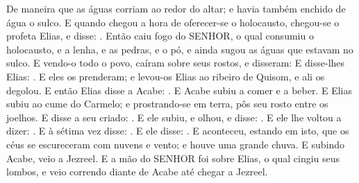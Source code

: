 {  De maneira que as águas corriam ao redor do altar; e havia também enchido de água o sulco.
  E quando chegou a hora de oferecer-se o holocausto, chegou-se o profeta Elias, e disse: .
  Então caiu fogo do SENHOR, o qual consumiu o holocausto, e a lenha, e as pedras, e o pó, e ainda sugou as águas que estavam no sulco.
  E vendo-o todo o povo, caíram sobre seus rostos, e disseram: 
  E disse-lhes Elias: . E eles os prenderam; e levou-os Elias ao ribeiro de Quisom, e ali os degolou.
  E então Elias disse a Acabe: .
  E Acabe subiu a comer e a beber. E Elias subiu ao cume do Carmelo; e prostrando-se em terra, pôs seu rosto entre os joelhos.
  E disse a seu criado: . E ele subiu, e olhou, e disse: . E ele lhe voltou a dizer: .
  E à sétima vez disse: . E ele disse: .
  E aconteceu, estando em isto, que os céus se escureceram com nuvens e vento; e houve uma grande chuva. E subindo Acabe, veio a Jezreel.
  E a mão do SENHOR foi sobre Elias, o qual cingiu seus lombos, e veio correndo diante de Acabe até chegar a Jezreel.
\par }

